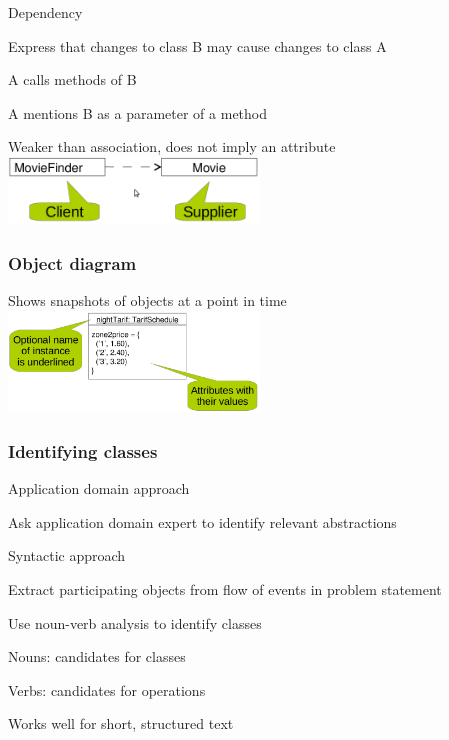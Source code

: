 	\item Dependency
	\enumstart
		\item Express that changes to class B may cause changes to class A
		\enumstart
			\item A calls methods of B
			\item A mentions B as a parameter of a method
		\enumend
		\item Weaker than association, does not imply an attribute
	\enumend
	\includegraphics[width=0.5\textwidth]{img/dependency.png}
\enumend

\subsubsection{Object diagram}
\enumstart
	\item Shows snapshots of objects at a point in time
	\\ \includegraphics[width=0.5\textwidth]{img/object_diagram.png}
\enumend

\subsubsection{Identifying classes}
\enumstart
	\item Application domain approach
	\enumstart
		\item Ask application domain expert to identify relevant abstractions
	\enumend

	\item Syntactic approach
	\enumstart
		\item Extract participating objects from flow of events in problem statement
		\item Use noun-verb analysis to identify classes
		\enumstart
			\item Nouns: candidates for classes
			\item Verbs: candidates for operations
			\item Works well for short, structured text
		\enumend
	\enumend


